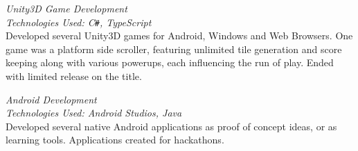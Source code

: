 \documentclass[]{res}
\begin{document}
{			\textit{Unity3D Game Development}\\
			{\textit{\footnotesize{Technologies Used: C\texttt{\#}, TypeScript}}}\\
			Developed several Unity3D games for Android, Windows and Web Browsers. One game was a platform side scroller, featuring unlimited tile generation and score keeping along with various powerups, each influencing the run of play. Ended with limited release on the title.
			
			\textit{Android Development}\\
			{\textit{\footnotesize{Technologies Used: Android Studios, Java}}}\\
			Developed several native Android applications as proof of concept ideas, or as learning tools. Applications created for hackathons.

	}
		
%
%
%			
%			
%			
%			
%
%			
%	

\end{document}
